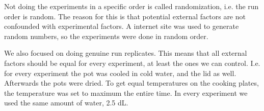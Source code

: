 Not doing the experiments in a specific order is called randomization, i.e. the run order is random. The reason for this is that potential external factors are not confounded with experimental factors. A internet site was used to generate random numbers, so the experiments were done in random order.  

We also focused on doing genuine run replicates. This means that all external factors should be equal for every experiment, at least the ones we can control. I.e. for every experiment the pot was cooled in cold water, and the lid as well. Afterwards the pots were dried. To get equal temperatures on the cooking plates, the temperature was set to maximum the entire time. In every experiment we used the same amount of water, 2.5 dL.